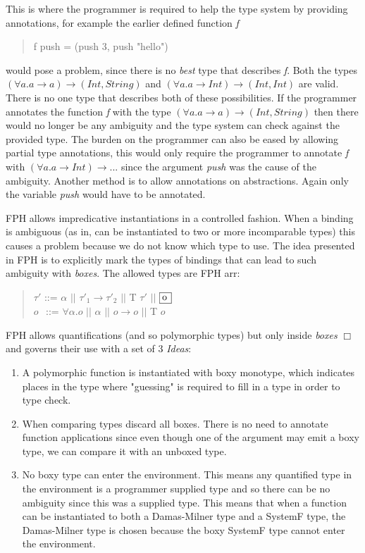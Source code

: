 This is where the programmer is required to help the type system by providing annotations, for example the earlier defined function \emph{f}
\begin{quotation}
f push = (push 3, push "hello")
\end{quotation}
would pose a problem, since there is no \emph{best} type that describes \emph{f}. Both the types $(\forall a. a \rightarrow a) \rightarrow (Int, String)$ and $(\forall a. a \rightarrow Int) \rightarrow (Int, Int)$ are valid. There is no one type that describes both of these possibilities.
If the programmer annotates the function \emph{f} with the type $(\forall a. a \rightarrow a) \rightarrow (Int, String)$ then there would no longer be any ambiguity and the type system can check against the provided type.
The burden on the programmer can also be eased by allowing partial type annotations, this would only require the programmer to annotate \emph{f} with $(\forall a. a \rightarrow Int) \rightarrow ...$ since the argument \emph{push} was the cause of the ambiguity. Another method is to allow annotations on abstractions. Again only the variable \emph{push} would have to be annotated.

FPH allows impredicative instantiations in a controlled fashion. When a binding is ambiguous (as in, can be instantiated to two or more incomparable types) this causes a problem because we do not know which type to use. The idea presented in FPH is to explicitly mark the types of bindings that can lead to such ambiguity with \textit{boxes}. The allowed types are FPH arr:

\begin{quotation}
$\tau'$ ::= $\alpha$ $||$  $\tau'_1 \rightarrow \tau'_2$ $||$ T $\tau'$ $||$ $\framebox[0.45cm][l]{o}$ \\
\indent $o$ $\hspace{1pt}$ ::= $\forall \alpha.o$ $||$ $\alpha$ $||$ $o \rightarrow o$ $||$ T $o$
\end{quotation}

FPH allows quantifications (and so polymorphic types) but only inside \emph{boxes} $\Box$ and governs their use with a set of 3 \textit{Ideas}\cite{FPH}:

\begin{enumerate}
\item A polymorphic function is instantiated with boxy monotype, which indicates places in the type where "guessing" is required to fill in a type in order to type check.
\item When comparing types discard all boxes. There is no need to annotate function applications since even though one of the argument may emit a boxy type, we can compare it with an unboxed type.
\item No boxy type can enter the environment. This means any quantified type in the environment is a programmer supplied type and so there can be no ambiguity since this was a supplied type. This means that when a function can be instantiated to both a Damas-Milner type and a SystemF type, the Damas-Milner type is chosen because the boxy SystemF type cannot enter the environment.
\end{enumerate}

